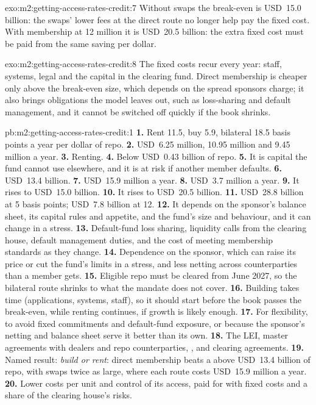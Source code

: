 \begin{solution}{exo:m2:getting-access-rates-credit:7}
Without swaps the break-even is USD~15.0 billion: the swaps' lower fees at the direct
route no longer help pay the fixed cost. With membership at 12 million it is USD~20.5
billion: the extra fixed cost must be paid from the same saving per dollar.
\end{solution}

\begin{solution}{exo:m2:getting-access-rates-credit:8}
The fixed costs recur every year: staff, systems, legal and the capital in the clearing
fund. Direct membership is cheaper only above the break-even size, which depends on the
spread sponsors charge; it also brings obligations the model leaves out, such as
loss-sharing and default management, and it cannot be switched off quickly if the book
shrinks.
\end{solution}

\begin{solution}{pb:m2:getting-access-rates-credit:1}
\textbf{1.} Rent 11.5, buy 5.9, bilateral 18.5 basis points a year per dollar of repo.
\textbf{2.} USD~6.25 million, 10.95 million and 9.45 million a year.
\textbf{3.} Renting.
\textbf{4.} Below USD~0.43 billion of repo.
\textbf{5.} It is capital the fund cannot use elsewhere, and it is at risk if another
member defaults.
\textbf{6.} USD~13.4 billion.
\textbf{7.} USD~15.9 million a year.
\textbf{8.} USD~3.7 million a year.
\textbf{9.} It rises to USD~15.0 billion.
\textbf{10.} It rises to USD~20.5 billion.
\textbf{11.} USD~28.8 billion at 5 basis points; USD~7.8 billion at 12.
\textbf{12.} It depends on the sponsor's balance sheet, its capital rules and appetite,
and the fund's size and behaviour, and it can change in a stress.
\textbf{13.} Default-fund loss sharing, liquidity calls from the clearing house, default
management duties, and the cost of meeting membership standards as they change.
\textbf{14.} Dependence on the sponsor, which can raise its price or cut the fund's
limits in a stress, and less netting across counterparties than a member gets.
\textbf{15.} Eligible repo must be cleared from June 2027, so the bilateral route
shrinks to what the mandate does not cover.
\textbf{16.} Building takes time (applications, systems, staff), so it should start
before the book passes the break-even, while renting continues, if growth is likely
enough.
\textbf{17.} For flexibility, to avoid fixed commitments and default-fund exposure, or
because the sponsor's netting and balance sheet serve it better than its own.
\textbf{18.} The LEI, master agreements with dealers and repo counterparties, , and clearing agreements.
\textbf{19.} Named result: \emph{build or rent}: direct membership beats a  above USD~13.4 billion of repo, with swaps twice as large, where each route costs
USD~15.9 million a year.
\textbf{20.} Lower costs per unit and control of its access, paid for with fixed costs
and a share of the clearing house's risks.
\end{solution}

